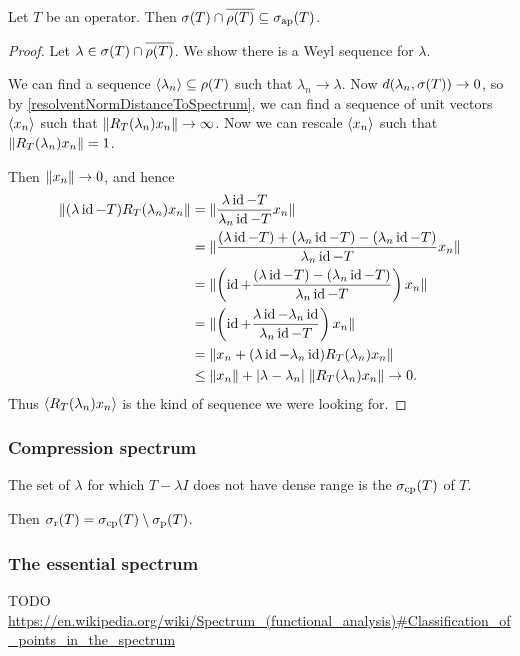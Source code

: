 \begin{corollary}
Let $T$ be an operator. Then $\sigma(T)\cap \overline{\rho(T)} \subseteq \sigma_\text{ap}(T)$.
\end{corollary}
\begin{proof}
Let $\lambda \in \sigma(T)\cap \overline{\rho(T)}$. We show there is a Weyl sequence for $\lambda$.

We can find a sequence $\left\langle \lambda_n \right\rangle\subseteq \rho(T)$ such that $\lambda_n \to \lambda$.
Now $d(\lambda_n, \sigma(T)) \to 0$, so by \ref{resolventNormDistanceToSpectrum}, we can find a sequence of unit vectors $\left\langle x_n \right\rangle$ such that $\lVert R_T(\lambda_n)x_n\rVert \to \infty$. Now we can rescale $\left\langle x_n \right\rangle$ such that $\lVert R_T(\lambda_n)x_n\rVert = 1$.

Then $\lVert x_n\rVert\to 0$, and hence
\begin{align*}
\lVert(\lambda\operatorname{id} - T)R_T(\lambda_n)x_n\rVert &= \lVert\frac{\lambda\operatorname{id} - T}{\lambda_n\operatorname{id} - T}x_n\rVert \\
&= \lVert\frac{(\lambda\operatorname{id} - T) + (\lambda_n\operatorname{id} - T) - (\lambda_n\operatorname{id} - T)}{\lambda_n\operatorname{id} - T}x_n\rVert \\
&= \lVert\left(\operatorname{id} + \frac{(\lambda\operatorname{id} - T) - (\lambda_n\operatorname{id} - T)}{\lambda_n\operatorname{id} - T}\right)x_n\rVert \\
&= \lVert\left(\operatorname{id} + \frac{\lambda\operatorname{id} - \lambda_n\operatorname{id}}{\lambda_n\operatorname{id} - T}\right)x_n\rVert \\
&= \lVert x_n + (\lambda\operatorname{id} - \lambda_n\operatorname{id})R_T(\lambda_n)x_n\rVert \\
&\leq \lVert x_n\rVert + |\lambda - \lambda_n|\;\lVert R_T(\lambda_n)x_n\rVert \to 0.
\end{align*}
Thus $\left\langle R_T(\lambda_n)x_n \right\rangle$ is the kind of sequence we were looking for.
\end{proof}




\subsubsection{Compression spectrum}
\begin{definition}
The set of $\lambda$ for which $T-\lambda I$ does not have dense range is the  $\sigma_\text{cp}(T)$ of $T$.
\end{definition}
Then $\sigma_\text{r}(T) = \sigma_\text{cp}(T)\setminus\sigma_\text{p}(T)$.

\subsubsection{The essential spectrum}
TODO \url{https://en.wikipedia.org/wiki/Spectrum_(functional_analysis)#Classification_of_points_in_the_spectrum}


